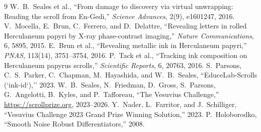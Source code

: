 \documentclass[11pt,a4paper]{article}
\begin{document}
\begin{thebibliography}{9}
 W.~B.~Seales et al., ``From damage to discovery via virtual unwrapping: Reading the scroll from En-Gedi,'' \textit{Science Advances}, 2(9), e1601247, 2016.
 V.~Mocella, E.~Brun, C.~Ferrero, and D.~Delattre, ``Revealing letters in rolled Herculaneum papyri by X-ray phase-contrast imaging,'' \textit{Nature Communications}, 6, 5895, 2015.
 E.~Brun et al., ``Revealing metallic ink in Herculaneum papyri,'' \textit{PNAS}, 113(14), 3751--3754, 2016.
 P.~Tack et al., ``Tracking ink composition on Herculaneum papyrus scrolls,'' \textit{Scientific Reports}, 6, 20763, 2016.
 S.~Parsons, C.~S.~Parker, C.~Chapman, M.~Hayashida, and W.~B.~Seales, ``EduceLab-Scrolls (`ink-id`),'' 2023.
 W.~B.~Seales, N.~Friedman, D.~Gross, S.~Parsons, G.~Angelotti, B.~Kyles, and P.~Tafforeau, ``The Vesuvius Challenge,'' \url{https://scrollprize.org}, 2023--2026.
 Y.~Nader, L.~Farritor, and J.~Schilliger, ``Vesuvius Challenge 2023 Grand Prize Winning Solution,'' 2023.
 P.~Holoborodko, ``Smooth Noise Robust Differentiators,'' 2008.
\end{thebibliography}
\end{document}
